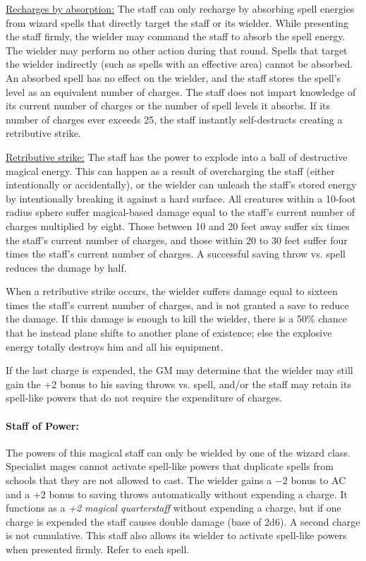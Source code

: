 \begin{multicols}{2}
\underline{Recharges by absorption:} The staff can only recharge by absorbing spell energies from wizard spells that directly target the staff or its wielder.  While presenting the staff firmly, the wielder may command the staff to absorb the spell energy.  The wielder may perform no other action during that round.  Spells that target the wielder indirectly (such as spells with an effective area) cannot be absorbed.  An absorbed spell has no effect on the wielder, and the staff stores the spell's level as an equivalent number of charges.  The staff does not impart knowledge of its current number of charges or the number of spell levels it absorbs.  If its number of charges ever exceeds 25, the staff instantly self-destructs creating a retributive strike.

\underline{Retributive strike:} The staff has the power to explode into a ball of destructive magical energy.  This can happen as a result of overcharging the staff (either intentionally or accidentally), or the wielder can unleash the staff's stored energy by intentionally breaking it against a hard surface.  All creatures within a 10-foot radius sphere suffer magical-based damage equal to the staff's current number of charges multiplied by eight.  Those between 10 and 20 feet away suffer six times the staff's current number of charges, and those within 20 to 30 feet suffer four times the staff's current number of charges.  A successful saving throw vs. spell reduces the damage by half.  

When a retributive strike occurs, the wielder suffers damage equal to sixteen times the staff's current number of charges, and is not granted a save to reduce the damage.  If this damage is enough to kill the wielder, there is a 50\% chance that he instead plane shifts to another plane of existence; else the explosive energy totally destroys him and all his equipment.  

If the last charge is expended, the GM may determine that the wielder may still gain the +2 bonus to his saving throws vs. spell, and/or the staff may retain its spell-like powers that do not require the expenditure of charges.

\paragraph{Staff of Power:} The powers of this magical staff can only be wielded by one of the wizard class.  Specialist mages cannot activate spell-like powers that duplicate spells from schools that they are not allowed to cast.  The wielder gains a $-2$ bonus to AC and a +2 bonus to saving throws automatically without expending a charge.  It functions as a \textit{+2 magical quarterstaff} without expending a charge, but if one charge is expended the staff causes double damage (base of 2d6).  A second charge is not cumulative.  This staff also allows its wielder to activate spell-like powers when presented firmly.  Refer to each spell.


\end{multicols}
